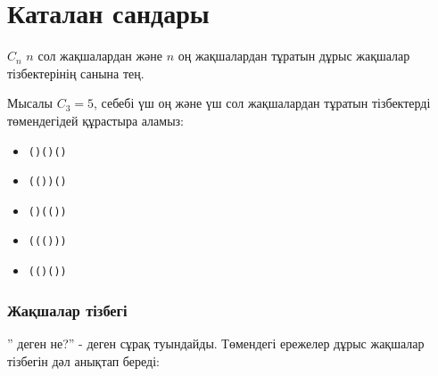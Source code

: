 
\section{Каталан сандары}


 $C_n$ 
$n$ сол жақшалардан және $n$ оң жақшалардан
тұратын дұрыс жақшалар тізбектерінің санына тең. 


Мысалы $C_3=5$, себебі
үш оң және үш сол жақшалардан
тұратын тізбектерді төмендегідей құрастыра аламыз:


\begin{itemize}[noitemsep]
\item \texttt{()()()}
\item \texttt{(())()}
\item \texttt{()(())}
\item \texttt{((()))}
\item \texttt{(()())}
\end{itemize}

\subsubsection{Жақшалар тізбегі}


'' деген не?'' - деген сұрақ туындайды. 
Төмендегі ережелер дұрыс жақшалар тізбегін дәл анықтап береді:


